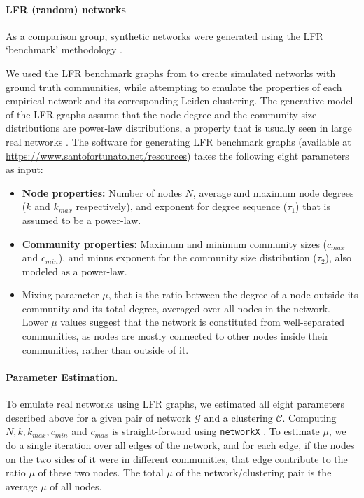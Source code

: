 \documentclass[a4paper]{article}   	%
\begin{document}
\paragraph{LFR (random) networks}
As a comparison group, synthetic networks were generated using the LFR `benchmark' methodology \citep{Lancichinetti2008}. %

We used the LFR benchmark graphs from \cite{lancichinetti2008benchmark} to create simulated networks with ground truth communities, while attempting to emulate the properties of each empirical network and its corresponding Leiden clustering. The generative model of the LFR graphs assume that the node degree and the community size distributions are power-law distributions, a property that is usually seen in large real networks \citep{albert2002statistical}. The software for generating LFR benchmark graphs (available at \href{https://www.santofortunato.net/resources}{https://www.santofortunato.net/resources}) takes the following eight parameters as input:
\begin{itemize}
    \item  \textbf{Node properties:} Number of nodes $N$, average and maximum node degrees ($k$ and $k_{max}$ respectively), and exponent for degree sequence ($\tau_1$) that is assumed to be a power-law.
    \item \textbf{Community properties:} Maximum and minimum community sizes ($c_{max}$ and $c_{min}$), and minus exponent for the community size distribution ($\tau_2$), also modeled as a power-law.
    \item Mixing parameter $\mu$, that is the ratio between the degree of a node outside its community and its total degree, averaged over all nodes in the network. Lower $\mu$ values suggest that the network is constituted from well-separated communities, as nodes are mostly connected to other nodes inside their communities, rather than outside of it.
\end{itemize}


\paragraph{Parameter Estimation.} To emulate real networks using LFR graphs, we estimated all eight parameters described above for a given pair of network $\mathcal{G}$ and a clustering $\mathcal{C}$. Computing $N, k, k_{max}, c_{min}$ and $c_{max}$ is straight-forward using \texttt{networkX} \citep{hagberg2008exploring}. To estimate $\mu$, we do a single iteration over all edges of the network, and for each edge, if the nodes on the two sides of it were in different communities, that edge contribute to the ratio $\mu$ of these two nodes. The total $\mu$ of the network/clustering pair is the average $\mu$ of all nodes.
\end{document}
